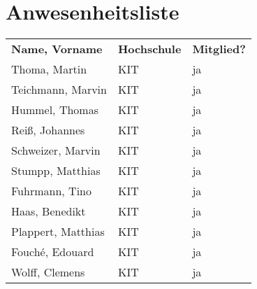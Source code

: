 \documentclass[a4paper,12pt,oneside]{scrartcl} %
\renewcommand{\thesection}{TOP \arabic{section}} %
\begin{document}
\cleardoublepage
\newpage
%
\renewcommand{\thesection}{Anhang \arabic{section}} \setcounter{section}{0}
\section{Anwesenheitsliste}
\begin{tabular}{l l l}
\textbf{Name, Vorname}	& \textbf{Hochschule}	&  \textbf{Mitglied?}	\\
Thoma, Martin & KIT & ja \\
Teichmann, Marvin & KIT & ja \\
Hummel, Thomas & KIT & ja \\
Reiß, Johannes & KIT & ja \\
Schweizer, Marvin & KIT & ja \\
Stumpp, Matthias & KIT & ja \\
Fuhrmann, Tino & KIT & ja \\
Haas, Benedikt & KIT & ja \\
Plappert, Matthias & KIT & ja \\
Fouché, Edouard & KIT & ja \\
Wolff, Clemens & KIT & ja \\
\end{tabular}
\end{document}
